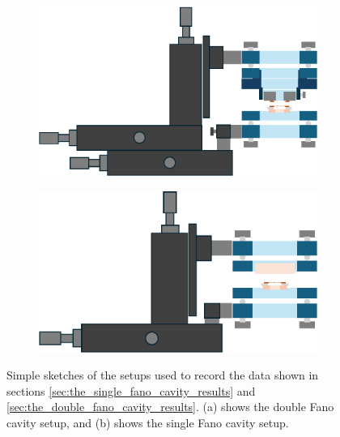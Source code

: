 \begin{figure}[h!]
    \centering
    \begin{subfigure}[b]{0.49\textwidth}
        \includegraphics[width=\textwidth]{figures/double_fano_sketch_discussion.pdf}
        \caption{}
        \label{fig:double_fano_discussion}
    \end{subfigure}
    \begin{subfigure}[b]{0.49\textwidth}
        \includegraphics[width=\textwidth]{figures/single_fano_sketch_discussion.pdf}
        \caption{}
        \label{fig:single_fano_discussion}
    \end{subfigure}
    \caption{Simple sketches of the setups used to record the data shown in sections \ref{sec:the_single_fano_cavity_results} and \ref{sec:the_double_fano_cavity_results}. (a) shows the double Fano cavity setup, and (b) shows the single Fano cavity setup.}
    \label{fig:single_vs_double_sketch}
\end{figure}

